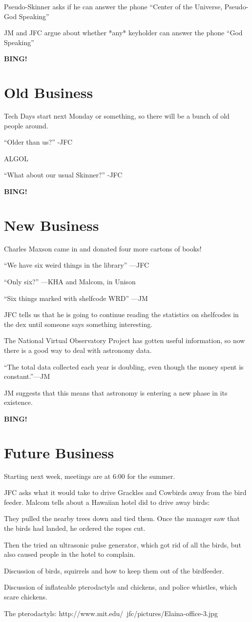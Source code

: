 \documentclass[12pt]{article}
\newcommand{\bing}{{\bf BING!} }
\newcommand{\goto}[1]{\bing \vskip 12pt \section*{#1}}
\begin{document}
Pseudo-Skinner asks if he can answer the phone ``Center of the
Universe, Pseudo-God Speaking'' 

JM and JFC argue about whether *any* keyholder can answer the phone
``God Speaking''

\goto{Old Business}
Tech Days start next Monday or something, so there will be a bunch of
old people around. 

``Older than us?'' -JFC

ALGOL

``What about our usual Skinner?'' -JFC

\goto{New Business}
Charles Maxson came in and donated four more cartons of books!

``We have six weird things in the library'' ---JFC

``Only six?'' ---KHA and Malcom, in Unison

``Six things marked with shelfcode WRD'' ---JM

JFC tells us that he is going to continue reading the statistics on
shelfcodes in the dex until someone says something interesting.

The National Virtual Observatory Project has gotten useful
information, so now there is a good way to deal with astronomy data.

``The total data collected each year is doubling, even though the money
spent is constant.''---JM

JM suggests that this means that astronomy is entering a new phase in
its existence.


\goto{Future Business}
Starting next week, meetings are at 6:00 for the summer.

JFC asks what it would take to drive Grackles and Cowbirds away from the bird
feeder. Malcom tells about a Hawaiian hotel did to drive away
birds: 

They pulled the nearby trees down and tied them. Once the manager saw
that the birds had landed, he ordered the ropes cut.

Then the tried an ultrasonic pulse generator, which got rid of all the
birds, but also caused people in the hotel to complain.

Discussion of birds, squirrels and how to keep them out of the birdfeeder.

Discussion of inflateable pterodactyls and chickens, and police
whistles, which scare chickens.

The pterodactyls: http://www.mit.edu/~jfc/pictures/Elaina-office-3.jpg
\end{document}
